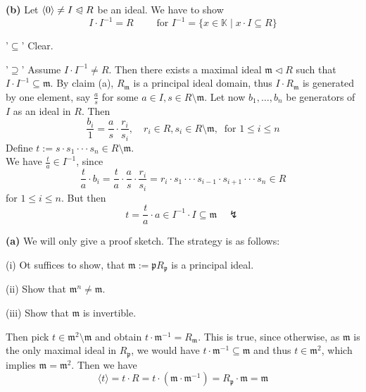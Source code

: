 \documentclass[12pt]{book}
\begin{document}
\begin{spacing}{1.3}
\begin{compactenum}
\item[\textbf{(b)}] Let $\langle 0 \rangle \neq I \trianglelefteqslant R$ be an ideal. We have to show
$$I \cdot I^{-1}=R\qquad \textrm{ for } I^{-1}=\{x \in \mathbb{K} \mid x \cdot I \subseteq R\}$$
\begin{compactitem}
\item['$\subseteq$'] Clear.
\item['$\supseteq$'] Assume $I\cdot I^{-1} \neq R$. Then there exists a maximal ideal $\mathfrak{m}\triangleleft R$ such that $I\cdot I^{-1} \subseteq \mathfrak{m}$. By claim (a), $R_{\mathfrak{m}}$ is a principal ideal domain, thus $I\cdot R_{\mathfrak{m}}$ is generated by one element, say $\frac{a}{s}$ for some $a \in I, s \in R\setminus \mathfrak{m}$.
Let now $b_1, \ldots, b_n$ be generators of $I$ as an ideal in $R$. Then 
$$\frac{b_i}{1}=\frac{a}{s} \cdot \frac{r_i}{s_i}, \quad r_i \in R, s_i \in R\setminus \mathfrak{m}, \ \textrm{ for } 1 \leqslant i \leqslant n$$
Define $t:= s \cdot s_1 \cdot \cdot \cdot s_n \in R\setminus \mathfrak{m}$.\\
We have $\frac{t}{a} \in I^{-1}$, since
$$\frac{t}{a} \cdot b_i= \frac{t}{a} \cdot \frac{a}{s} \cdot \frac{r_i}{s_i}=r_i \cdot s_1 \cdot \cdot \cdot s_{i-1} \cdot s_{i+1} \cdot \cdot \cdot s_n \in R$$
for $1 \leqslant i \leqslant n$. But then 
$$t=\frac{t}{a} \cdot a \in I^{-1} \cdot I \subseteq \mathfrak{m} \quad \lightning$$
\end{compactitem}
\item[\textbf{(a)}] We will only give a proof sketch. The strategy is as follows:
\begin{compactenum}
\item[(i)] Ot suffices to show, that $\mathfrak{m}:=\mathfrak{p}R_{\mathfrak{p}}$ is a principal ideal.
\item[(ii)] Show that $\mathfrak{m}^n \neq \mathfrak{m}$.
\item[(iii)] Show that $\mathfrak{m}$ is invertible.
\end{compactenum}
Then pick $t \in \mathfrak{m}^2 \setminus \mathfrak{m}$ and obtain $t\cdot \mathfrak{m}^{-1}=R_{\mathfrak{m}}$. This is true, since otherwise, as $\mathfrak{m}$ is the only maximal ideal in $R_{\mathfrak{p}}$, we would have $t \cdot \mathfrak{m}^{-1} \subseteq \mathfrak{m}$ and thus $t \in \mathfrak{m}^2$, which implies $\mathfrak{m}=\mathfrak{m}^2$. Then we have
$$\langle t \rangle = t \cdot R = t \cdot (\mathfrak{m} \cdot \mathfrak{m}^{-1})=R_{\mathfrak{p}} \cdot \mathfrak{m} = \mathfrak{m}$$



\end{compactenum}
\end{spacing}
\end{document}
